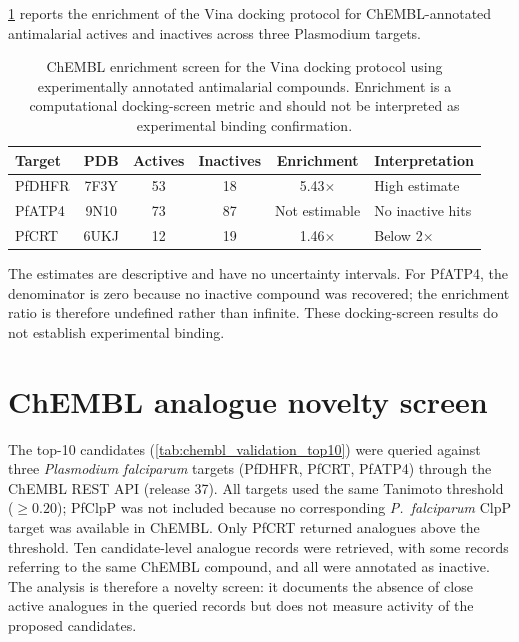 \documentclass[11pt,a4paper]{article}
\begin{document}
\cref{tab:chembl_enrichment} reports the enrichment of the Vina docking protocol for ChEMBL-annotated antimalarial actives and inactives across three Plasmodium targets.

\begin{table}[htbp]
\centering
\caption{ChEMBL enrichment screen for the Vina docking protocol using experimentally annotated antimalarial compounds. Enrichment is a computational docking-screen metric and should not be interpreted as experimental binding confirmation.}
\label{tab:chembl_enrichment}
\begin{tabularx}{\textwidth}{l c c c c l}
\toprule
Target & PDB & {Actives} & {Inactives} & {Enrichment} & Interpretation \\
\midrule
PfDHFR & 7F3Y & 53 & 18 & 5.43$\times$ & High estimate \\
PfATP4 & 9N10 & 73 & 87 & Not estimable & No inactive hits \\
PfCRT & 6UKJ & 12 & 19 & 1.46$\times$ & Below 2$\times$ \\
\bottomrule
\end{tabularx}
\vspace{1mm}
\footnotesize The estimates are descriptive and have no uncertainty intervals. For PfATP4, the denominator is zero because no inactive compound was recovered; the enrichment ratio is therefore undefined rather than infinite. These docking-screen results do not establish experimental binding.
\end{table}




\section{ChEMBL analogue novelty screen}
\label{sec:chembl_validation}

The top-10 candidates (\cref{tab:chembl_validation_top10}) were queried against three \textit{Plasmodium falciparum} targets (PfDHFR, PfCRT, PfATP4) through the ChEMBL REST API (release 37). All targets used the same Tanimoto threshold ($\geq 0.20$); PfClpP was not included because no corresponding \textit{P.~falciparum} ClpP target was available in ChEMBL. Only PfCRT returned analogues above the threshold. Ten candidate-level analogue records were retrieved, with some records referring to the same ChEMBL compound, and all were annotated as inactive. The analysis is therefore a novelty screen: it documents the absence of close active analogues in the queried records but does not measure activity of the proposed candidates.
\end{document}
